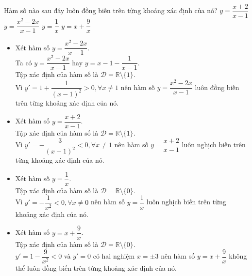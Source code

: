 \begin{ex}%
 Hàm số nào sau đây luôn đồng biến trên từng khoảng xác định của nó?
 \choice
  {$y = \dfrac{x+2}{x-1}$}
  {\True $y = \dfrac{x^2-2x}{x-1}$}
  {$y = \dfrac{1}{x}$}
  {$y = x + \dfrac{9}{x}$}
 \loigiai
  {
  \begin{itemize}
   \item Xét hàm số $y = \dfrac{x^2-2x}{x-1}$.\\
   Ta có $y = \dfrac{x^2-2x}{x-1}$ hay $y = x - 1 - \dfrac{1}{x-1}$.\\
   Tập xác định của hàm số là $\mathscr{D} = \mathbb{R} \setminus \{1\}$.\\
   Vì $y' = 1 + \dfrac{1}{(x-1)^2} > 0 , \forall x \neq 1$ nên hàm số $y = \dfrac{x^2-2x}{x-1}$ luôn đồng biến trên từng khoảng xác định của nó.
   \item Xét hàm số $y = \dfrac{x+2}{x-1}$.\\
   Tập xác định của hàm số là $\mathscr{D} = \mathbb{R} \setminus \{1\}$.\\
   Vì $y' = -\dfrac{3}{(x-1)^2} < 0 , \forall x \neq 1$ nên hàm số $y = \dfrac{x+2}{x-1}$ luôn nghịch biến trên từng khoảng xác định của nó.
   \item Xét hàm số $y = \dfrac{1}{x}$.\\
   Tập xác định của hàm số là $\mathscr{D} = \mathbb{R} \setminus \{0\}$.\\
   Vì $y' = -\dfrac{1}{x^2} < 0 , \forall x \neq 0$ nên hàm số $y = \dfrac{1}{x}$ luôn nghịch biến trên từng khoảng xác định của nó.
   \item Xét hàm số $y = x+\dfrac{9}{x}$.\\
   Tập xác định của hàm số là $\mathscr{D} = \mathbb{R} \setminus \{0\}$.\\
   $y' = 1-\dfrac{9}{x^2} < 0 $ và $y'=0$ có hai nghiệm $x=\pm 3$ nên hàm số $y = x+\dfrac{9}{x}$ không thể luôn đồng biến trên từng khoảng xác định của nó.
  \end{itemize}
  }
\end{ex}

